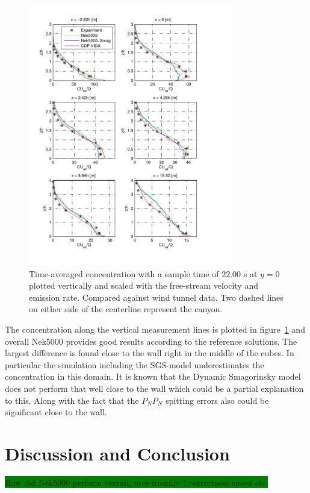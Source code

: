 \newpage
\begin{figure}[h]
    \centering
    \includegraphics[width=0.8\textwidth]{Figures/NekcV_all.pdf}
    \caption{Time-averaged concentration with a sample time of $22.00$ s at $y = 0$ plotted
    vertically and scaled 
    with the free-stream velocity and emission rate. Compared against wind tunnel data.
Two dashed lines on either side of the centerline represent the canyon.}
    \label{fig:cVall}
\end{figure}
The concentration along the vertical measurement lines is plotted in figure~\ref{fig:cVall} and overall 
Nek5000 provides good results according to the reference solutions. The largest difference is found close 
to the wall right in the middle of the cubes. In particular the simulation including the SGS-model 
underestimates the concentration in this domain. It is known that the Dynamic Smagorinsky model does not 
perform that well close to the wall which could be a partial explanation to this. Along with the fact that 
the $P_NP_N$ spitting errors also could be significant close to the wall.




\section{Discussion and Conclusion}
\colorbox{green}{How did Nek5000 perform overall, user-friendly ?,correctness,speed etc.}

